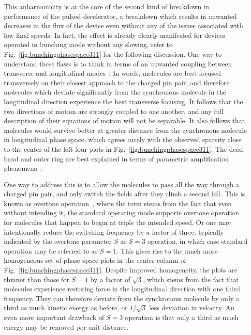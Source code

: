 This anharmonicity is at the core of the second kind of breakdown in performance of the pulsed decelerator, a breakdown which results in unwanted decreases in the flux of the device even without any of the issues associated with low final speeds.
In fact, the effect is already clearly manifested for devices operated in bunching mode without any slowing, refer to Fig.~\ref{fig:bunchingphasespace311} for the following discussion.
One way to understand these flaws is to think in terms of an unwanted coupling between transverse and longitudinal modes~\cite{VanDeMeerakker2006}.
In words, molecules are best focused transversely on their closest approach to the charged pin pair, and therefore molecules which deviate significantly from the synchronous molecule in the longitudinal direction experience the best transverse focusing.
It follows that the two directions of motion are strongly coupled to one another, and any full description of their equations of motion will not be separable.
It also follows that molecules would survive better at greater distance from the synchronous molecule in longitudinal phase space, which agrees nicely with the observed sparsity close to the center of the left four plots in Fig.~\ref{fig:bunchingphasespace311}.
The dead band and outer ring are best explained in terms of parametric amplification phenomena~\cite{VanDeMeerakker2006}.

One way to address this is to allow the molecules to pass all the way through a charged pin pair, and only switch the fields after they climb a second hill.
This is known as overtone operation~\cite{VanDeMeerakker2005a}, where the term stems from the fact that even without intending it, the standard operating mode supports overtone operation for molecules that happen to begin at triple the intended speed.
Or one may intentionally reduce the switching frequency by a factor of three, typically indicated by the overtone parameter $S$ as $S=3$ operation, in which case standard operation may be referred to as $S=1$.
This gives rise to the much more homogeneous set of phase space plots in the center column of Fig.~\ref{fig:bunchingphasespace311}.
Despite improved homogeneity, the plots are thinner than those for $S=1$ by a factor of $\sqrt{3}$, which stems from the fact that molecules experience restoring force in the longitudinal direction with one third frequency. 
They can therefore deviate from the synchronous molecule by only a third as much kinetic energy as before, or $1/\sqrt{3}$ less deviation in velocity.
An even more important drawback of $S=3$ operation is that only a third as much energy may be removed per unit distance.

